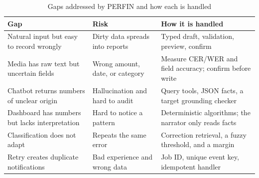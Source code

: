 \begin{table}[htbp]
  \centering
  \caption{Gaps addressed by PERFIN and how each is handled}
  \label{tab:research-gaps}
  \small
  \begin{tabularx}{\textwidth}{|X|X|X|}
    \hline
    \textbf{Gap} & \textbf{Risk} &
    \textbf{How it is handled} \\ \hline
    Natural input but easy to record wrongly & Dirty data spreads into
    reports & Typed draft, validation, preview, confirm \\ \hline
    Media has raw text but uncertain fields & Wrong amount, date, or
    category & Measure CER/WER and field accuracy; confirm before write
    \\ \hline
    Chatbot returns numbers of unclear origin & Hallucination and hard to
    audit & Query tools, JSON facts, a target grounding checker \\
    \hline
    Dashboard has numbers but lacks interpretation & Hard to notice a
    pattern & Deterministic algorithms; the narrator only reads facts \\
    \hline
    Classification does not adapt & Repeats the same error & Correction
    retrieval, a fuzzy threshold, and a margin \\ \hline
    Retry creates duplicate notifications & Bad experience and wrong data
    & Job ID, unique event key, idempotent handler \\ \hline
  \end{tabularx}
\end{table}

